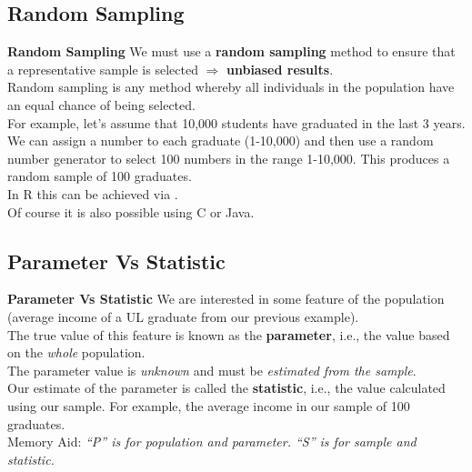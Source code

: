 \documentclass[compress]{beamer}        %
\makeatletter
\newcommand{\tcb}{\textcolor{beamer@blendedblue}}
\makeatother
\begin{document}
\subsection{Random Sampling}
\begin{frame}{\bf \tcb{Random Sampling}}
We must use a {\bf random sampling} method to ensure that a representative sample is selected $\Rightarrow$ {\bf unbiased results}.\\[0.6cm]
Random sampling is any method whereby all individuals in the population have an equal chance of being selected.\\[0.6cm]
For example, let's assume that 10,000 students have graduated in the last 3 years. We can assign a number to each graduate (1-10,000) and then use a random number generator to select 100 numbers in the range 1-10,000. This produces a random sample of 100 graduates.\\[0.6cm]
In R this can be achieved via .\\[0.2cm]
Of course it is also possible using C or Java.
\end{frame}


\subsection{Parameter Vs Statistic}
\begin{frame}{\bf \tcb{Parameter Vs Statistic}}
We are interested in some feature of the population (average income of a UL graduate from our previous example).\\[0.5cm]
The true value of this feature is known as the {\bf parameter}, i.e., the value based on the \emph{whole} population.\\[0.5cm]
The parameter value is \emph{unknown} and must be \emph{estimated from the sample}.\\[0.5cm]
Our estimate of the parameter is called the {\bf statistic}, i.e., the value calculated using our sample. For example, the average income in our sample of 100 graduates.\\[0.7cm]
Memory Aid: \emph{``P'' is for population and parameter.\newline
\phantom{Memory Aid:} ``S'' is for sample and statistic.}
\end{frame}
\end{document}
